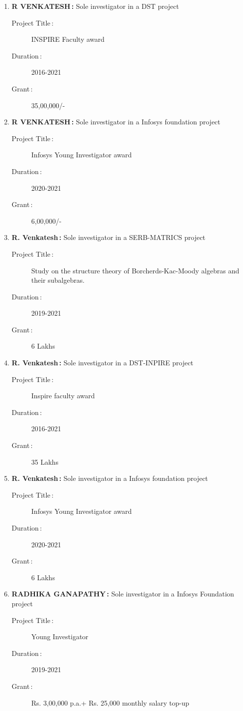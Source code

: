 \begin{enumerate}
\item {\bf R VENKATESH\,:} Sole investigator in a DST project
\begin{description}
  \item[Project Title\,:] INSPIRE Faculty award
  \item[Duration\,:] 2016-2021
  \item[Grant\,:] 35,00,000/-
\end{description}


\item {\bf R VENKATESH\,:} Sole investigator in a Infosys foundation project
\begin{description}
  \item[Project Title\,:] Infosys Young Investigator award
  \item[Duration\,:] 2020-2021
  \item[Grant\,:] 6,00,000/-
\end{description}


\item {\bf R. Venkatesh\,:} Sole investigator in a SERB-MATRICS project
\begin{description}
  \item[Project Title\,:] Study on the structure theory of Borcherds-Kac-Moody algebras and their subalgebras.
  \item[Duration\,:] 2019-2021
  \item[Grant\,:] 6 Lakhs
\end{description}


\item {\bf R. Venkatesh\,:} Sole investigator in a DST-INPIRE project
\begin{description}
  \item[Project Title\,:] Inspire faculty award
  \item[Duration\,:] 2016-2021
  \item[Grant\,:] 35 Lakhs
\end{description}


\item {\bf R. Venkatesh\,:} Sole investigator in a Infosys foundation project
\begin{description}
  \item[Project Title\,:] Infosys Young Investigator award
  \item[Duration\,:] 2020-2021
  \item[Grant\,:] 6 Lakhs
\end{description}


\item {\bf RADHIKA GANAPATHY\,:} Sole investigator in a Infosys Foundation project
\begin{description}
  \item[Project Title\,:] Young Investigator
  \item[Duration\,:] 2019-2021
  \item[Grant\,:] Rs. 3,00,000 p.a.+ Rs. 25,000 monthly salary top-up
\end{description}



\end{enumerate}
